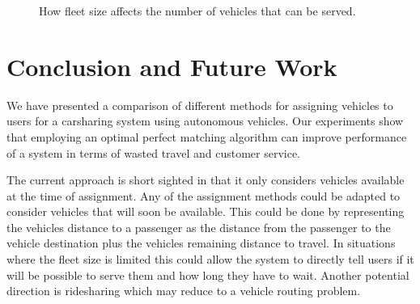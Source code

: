\documentclass[letterpaper]{article}
\begin{document}
\begin{figure}



	

\label{fleetSizeGraph}
\caption{How fleet size affects the number of vehicles that can be served.}
\end{figure}

\section{Conclusion and Future Work}

We have presented a comparison of different methods for assigning vehicles to users for a carsharing system using autonomous vehicles. Our experiments show that employing an optimal perfect matching algorithm can improve performance of a system in terms of wasted travel and customer service.

The current approach is short sighted in that it only considers vehicles available at the time of assignment. Any of the assignment methods could be adapted to consider vehicles that will soon be available. This could be done by representing the vehicles distance to a passenger as the distance from the passenger to the vehicle destination plus the vehicles remaining distance to travel. In situations where the fleet size is limited this could allow the system to directly tell users if it will be possible to serve them and how long they have to wait. Another potential direction is ridesharing which may reduce to a vehicle routing problem.



\end{document}
